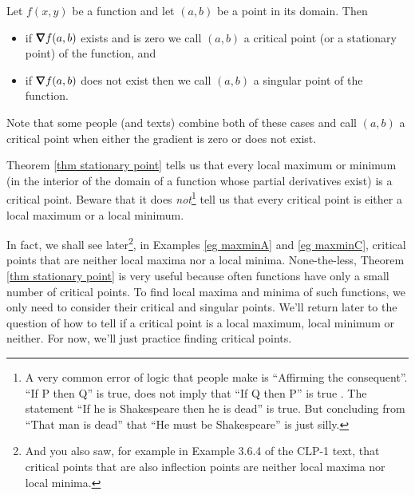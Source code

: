 \begin{defn}\label{def critical point} 
Let $f(x,y)$ be a function and let $(a,b)$ be a point in its domain. Then
\begin{itemize}
 \item if $\vnabla f(a,b)$ exists and is zero we call $(a,b)$ 
a critical point (or a stationary point) of the function, and
 \item if $\vnabla f(a,b)$ does not exist then we call $(a,b)$ 
a singular point of the  function.
\end{itemize}
\end{defn}

\begin{warning}\label{warn critical point} 
Note that some people (and texts) combine both of these cases and call 
$(a,b)$ a critical point when either the gradient is zero or does not exist. 
\end{warning}

\begin{warning}\label{warn saddle} 
Theorem \ref{thm stationary point} tells us that every local maximum 
or minimum (in the interior of the domain of a function whose partial derivatives exist) 
is a critical point.  Beware that it does \emph{not}\footnote{A very common 
error of logic that people make is ``Affirming the consequent''. 
``If P then Q'' is true, does not imply that ``If Q then P'' is true . 
The statement ``If he is Shakespeare then he is dead'' is true. 
But concluding from ``That man is dead'' that ``He must be Shakespeare''
is just silly. 
} 
tell us that every critical point is either a local maximum or a local minimum. 
\end{warning}


In fact, we shall see later\footnote{And you also saw, for example in
Example 3.6.4 of the CLP-1 text, that critical points that are also
inflection points are neither local maxima nor local minima.}, 
in Examples \ref{eg maxminA} and 
\ref{eg maxminC}, critical points that are neither local maxima nor a local minima. None-the-less, 
Theorem \ref{thm stationary point} is very useful because often functions have
only a small number of critical points. To find local maxima and minima
of such functions, we only need to consider their critical and singular
points. We'll return later to the question of how to tell if a 
critical point is a local maximum, local minimum or neither. For now, 
we'll just practice finding critical points. 

